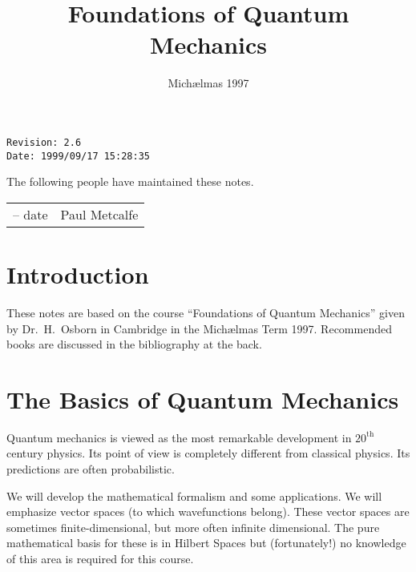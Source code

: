 \documentclass{notes}
\begin{document}
\frontmatter
\title{Foundations of Quantum Mechanics}
\date{Mich\ae lmas 1997}
\maketitle

\thispagestyle{empty}

\noindent\verb$Revision: 2.6 $\hfill\\
\noindent\verb$Date: 1999/09/17 15:28:35 $\hfill

\vspace{1.5in}

The following people have maintained these notes.

\begin{center}
\begin{tabular}{ r  l}
-- date & Paul Metcalfe
\end{tabular}
\end{center}

\tableofcontents

\chapter{Introduction}

These notes are based on the course ``Foundations of Quantum
Mechanics'' given by Dr.~H.~Osborn in Cambridge in the Mich\ae lmas
Term 1997.  Recommended books are discussed in the bibliography at the
back.

\alsoavailable
\archimcopyright

\mainmatter

\chapter[Basics]{The Basics of Quantum Mechanics}

Quantum mechanics is viewed as the most remarkable development in
$20^{\text{th}}$ century physics.  Its point of view is completely different
from classical physics.  Its predictions are often probabilistic.

We will develop the mathematical formalism and some applications.  We
will emphasize vector spaces (to which wavefunctions belong).  These vector
spaces are sometimes finite-dimensional, but more often infinite dimensional.
The pure mathematical basis for these is in Hilbert Spaces but 
(fortunately!) no knowledge of this area is required for this course.
\end{document}
